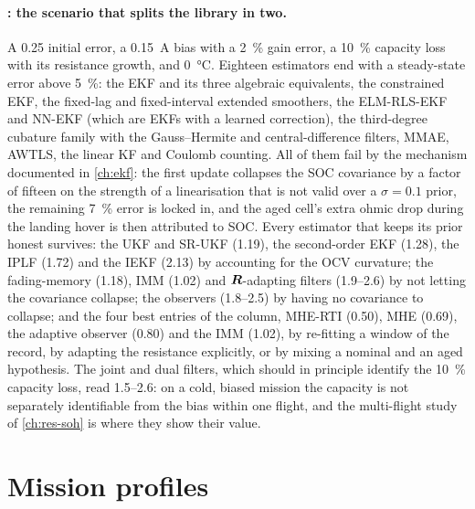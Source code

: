 \paragraph{: the scenario that splits the library in two.}
A \num{0.25} initial error, a \SI{0.15}{\ampere} bias with a \SI{2}{\percent} gain error, a
\SI{10}{\percent} capacity loss with its resistance growth, and \SI{0}{\celsius}. Eighteen
estimators end with a steady-state error above \SI{5}{\percent}: the EKF and its three
algebraic equivalents, the constrained EKF, the fixed-lag and fixed-interval extended smoothers,
the ELM-RLS-EKF and NN-EKF (which are EKFs with a learned correction), the third-degree
cubature family with the Gauss--Hermite and central-difference filters, MMAE, AWTLS, the linear
KF and Coulomb counting. All of them fail by the mechanism documented in \cref{ch:ekf}: the
first update collapses the SOC covariance by a factor of fifteen on the strength of a
linearisation that is not valid over a $\sigma = 0.1$ prior, the remaining \SI{7}{\percent}
error is locked in, and the aged cell's extra ohmic drop during the landing hover is then
attributed to SOC. Every estimator that keeps its prior honest survives: the UKF and SR-UKF
(\num{1.19}), the second-order EKF (\num{1.28}), the IPLF (\num{1.72}) and the IEKF
(\num{2.13}) by accounting for the OCV curvature; the fading-memory (\num{1.18}), IMM
(\num{1.02}) and $\bm{R}$-adapting filters (\num{1.9}--\num{2.6}) by not letting the covariance
collapse; the observers (\num{1.8}--\num{2.5}) by having no covariance to collapse; and the
four best entries of the column, MHE-RTI (\num{0.50}), MHE (\num{0.69}), the adaptive
observer (\num{0.80}) and the IMM (\num{1.02}), by re-fitting a window of the record, by
adapting the resistance explicitly, or by mixing a nominal and an aged hypothesis. The joint and dual filters, which should in principle identify the
\SI{10}{\percent} capacity loss, read \num{1.5}--\num{2.6}: on a cold, biased mission the
capacity is not separately identifiable from the bias within one flight, and the multi-flight
study of \cref{ch:res-soh} is where they show their value.

\section{Mission profiles}

